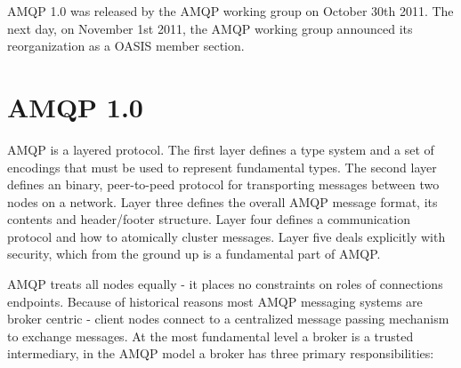 \documentclass{thesis}
\begin{document}





AMQP 1.0 was released by the AMQP working group on October 30th 2011.  The next day, on November 1st 2011, the AMQP working group announced its reorganization as a OASIS member section. %

\section{AMQP 1.0}

AMQP is a layered protocol.  The first layer defines a type system and a set of encodings that must be used to represent fundamental types.  The second layer defines an binary, peer-to-peed protocol for transporting messages between two nodes on a network.  Layer three defines the overall AMQP message format, its contents and header/footer structure.  Layer four defines a communication protocol and how to atomically cluster messages.  Layer five deals explicitly with security, which from the ground up is a fundamental part of AMQP. %


AMQP treats all nodes equally - it places no constraints on roles of connections endpoints.   Because of historical reasons most AMQP messaging systems are broker centric - client nodes connect to a centralized message passing mechanism to exchange messages.  At the most fundamental level a broker is a trusted intermediary, in the AMQP model a broker has three primary responsibilities:
\end{document}
